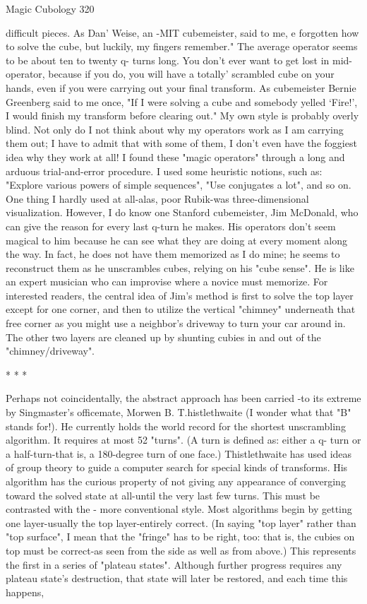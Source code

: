 Magic Cubology                                                                         320

difficult pieces. As Dan' Weise, an -MIT cubemeister, said to me, e forgotten how to
solve the cube, but luckily, my fingers remember."
        The average operator seems to be about ten to twenty q- turns long. You don't
ever want to get lost in mid-operator, because if you do, you will have a totally'
scrambled cube on your hands, even if you were carrying out your final transform. As
cubemeister Bernie Greenberg said to me once, "If I were solving a cube and
somebody yelled `Fire!', I would finish my transform before clearing out."
        My own style is probably overly blind. Not only do I not think about why my
operators work as I am carrying them out; I have to admit that with some of them, I
don't even have the foggiest idea why they work at all! I found these "magic
operators" through a long and arduous trial-and-error procedure. I used some heuristic
notions, such as: "Explore various powers of simple sequences", "Use conjugates a
lot", and so on. One thing I hardly used at all-alas, poor Rubik-was three-dimensional
visualization. However, I do know one Stanford cubemeister, Jim McDonald, who
can give the reason for every last q-turn he makes. His operators don't seem magical
to him because he can see what they are doing at every moment along the way. In
fact, he does not have them memorized as I do mine; he seems to reconstruct them as
he unscrambles cubes, relying on his "cube sense". He is like an expert musician who
can improvise where a novice must memorize. For interested readers, the central idea
of Jim's method is first to solve the top layer except for one corner, and then to utilize
the vertical "chimney" underneath that free corner as you might use a neighbor's
driveway to turn your car around in. The other two layers are cleaned up by shunting
cubies in and out of the "chimney/driveway".

                                        *   *   *

        Perhaps not coincidentally, the abstract approach has been carried -to its
extreme by Singmaster's officemate, Morwen B. T.histlethwaite (I wonder what that
"B" stands for!). He currently holds the world record for the shortest unscrambling
algorithm. It requires at most 52 "turns". (A turn is defined as: either a q- turn or a
half-turn-that is, a 180-degree turn of one face.) Thistlethwaite has used ideas of
group theory to guide a computer search for special kinds of transforms. His
algorithm has the curious property of not giving any appearance of converging toward
the solved state at all-until the very last few turns.
        This must be contrasted with the - more conventional style. Most algorithms
begin by getting one layer-usually the top layer-entirely correct. (In saying "top layer"
rather than "top surface", I mean that the "fringe" has to be right, too: that is, the
cubies on top must be correct-as seen from the side as well as from above.) This
represents the first in a series of "plateau states". Although further progress requires
any plateau state's destruction, that state will later be restored, and each time this
happens,




